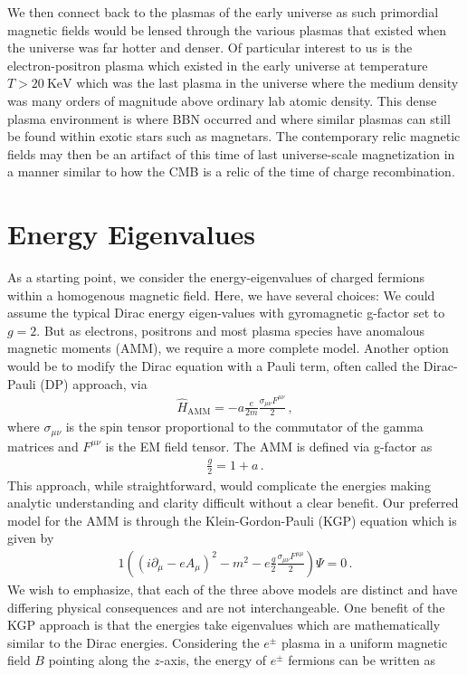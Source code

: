 \documentclass[Universe,article,submit,moreauthors,pdftex]{Definitions/mdpi}
\begin{document}
We then connect back to the plasmas of the early universe as such primordial magnetic fields would be lensed through the various plasmas that existed when the universe was far hotter and denser. Of particular interest to us is the electron-positron plasma which existed in the early universe at temperature $T>20\ \mathrm{KeV}$ which was the last plasma in the universe where the medium density was many orders of magnitude above ordinary lab atomic density. This dense plasma environment is where BBN occurred and where similar plasmas can still be found within exotic stars such as magnetars. The contemporary relic magnetic fields may then be an artifact of this time of last universe-scale magnetization in a manner similar to how the CMB is a relic of the time of charge recombination. 
\section{Energy Eigenvalues}\label{sec:energy}
\noindent As a starting point, we consider the energy-eigenvalues of charged fermions within a homogenous magnetic field. Here, we have several choices: We could assume the typical Dirac energy eigen-values with gyromagnetic g-factor set to $g=2$. But as electrons, positrons and most plasma species have anomalous magnetic moments (AMM), we require a more complete model. Another option would be to modify the Dirac equation with a Pauli term, often called the Dirac-Pauli (DP) approach, via
\begin{align}
  \label{Pauli} \hat{H}_{\mathrm{AMM}} = -a\frac{e}{2m}\frac{\sigma_{\mu\nu}F^{\mu\nu}}{2}\,,
\end{align}
where $\sigma_{\mu\nu}$ is the spin tensor proportional to the commutator of the gamma matrices and $F^{\mu\nu}$ is the EM field tensor. The AMM is defined via g-factor as
\begin{align}
  \label{AMM} \frac{g}{2}=1+a\,.
\end{align}
This approach, while straightforward, would complicate the energies making analytic understanding and clarity difficult without a clear benefit. Our preferred model for the AMM is through the Klein-Gordon-Pauli (KGP) equation which is given by
\begin{alignat}{1}
  \label{KGP} \left(\left(i\partial_{\mu}-eA_{\mu}\right)^{2}-m^{2}-e\frac{g}{2}\frac{\sigma_{\mu\nu}F^{\mu\mu}}{2}\right)\Psi=0\,.
\end{alignat}
We wish to emphasize, that each of the three above models are distinct and have differing physical consequences and are not interchangeable. One benefit of the KGP approach is that the energies take eigenvalues which are mathematically similar to the Dirac energies. Considering the $e^\pm$ plasma in a uniform magnetic field $B$ pointing along the $z$-axis, the energy of $e^\pm$ fermions can be written as
\end{document}
